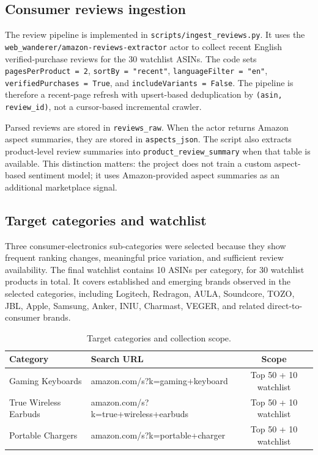 \subsection{Consumer reviews ingestion}

The review pipeline is implemented in
\texttt{scripts/ingest\_reviews.py}. It uses the
\texttt{web\_wanderer/amazon-reviews-extractor} actor to collect recent
English verified-purchase reviews for the 30 watchlist ASINs. The code
sets \texttt{pagesPerProduct = 2}, \texttt{sortBy = "recent"},
\texttt{languageFilter = "en"}, \texttt{verifiedPurchases = True}, and
\texttt{includeVariants = False}. The pipeline is therefore a recent-page
refresh with upsert-based deduplication by \texttt{(asin, review\_id)},
not a cursor-based incremental crawler.

Parsed reviews are stored in \texttt{reviews\_raw}. When the actor
returns Amazon aspect summaries, they are stored in
\texttt{aspects\_json}. The script also extracts product-level review
summaries into \texttt{product\_review\_summary} when that table is
available. This distinction matters: the project does not train a custom
aspect-based sentiment model; it uses Amazon-provided aspect summaries
as an additional marketplace signal.

\subsection{Target categories and watchlist}

Three consumer-electronics sub-categories were selected because they
show frequent ranking changes, meaningful price variation, and sufficient
review availability. The final watchlist contains 10 ASINs per category,
for 30 watchlist products in total. It covers established and emerging
brands observed in the selected categories, including Logitech,
Redragon, AULA, Soundcore, TOZO, JBL, Apple, Samsung, Anker, INIU,
Charmast, VEGER, and related direct-to-consumer brands.

\begin{table}[H]
  \centering
  \begin{tabular}{llc}
    \toprule
    \textbf{Category} & \textbf{Search URL} & \textbf{Scope} \\
    \midrule
    Gaming Keyboards      & amazon.com/s?k=gaming+keyboard       & Top 50 + 10 watchlist \\
    True Wireless Earbuds & amazon.com/s?k=true+wireless+earbuds & Top 50 + 10 watchlist \\
    Portable Chargers     & amazon.com/s?k=portable+charger      & Top 50 + 10 watchlist \\
    \bottomrule
  \end{tabular}
  \caption{Target categories and collection scope.}
  \label{tab:categories}
\end{table}

